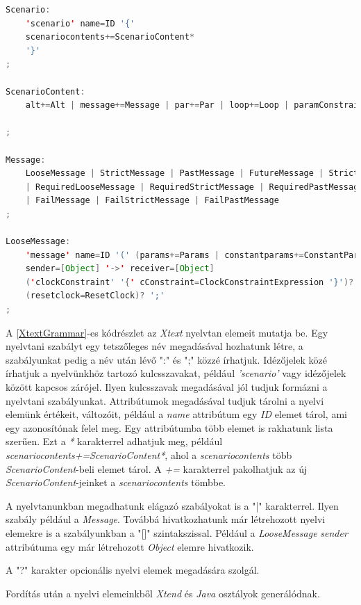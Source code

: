 \begin{lstlisting}[language=java, frame=single, float=ht!, caption={\textit{Xtext} nyelvtan elemei.},captionpos=b, label=XtextGrammar]
Scenario:
	'scenario' name=ID '{'
	scenariocontents+=ScenarioContent*
	'}'
;

ScenarioContent:
	alt+=Alt | message+=Message | par+=Par | loop+=Loop | paramConstraint+=ParameterConstraint

;

Message:
	LooseMessage | StrictMessage | PastMessage | FutureMessage | StrictFutureMessage
	| RequiredLooseMessage | RequiredStrictMessage | RequiredPastMessage | RequiredFutureMessage | RequiredStrictFutureMessage
	| FailMessage | FailStrictMessage | FailPastMessage
;

LooseMessage:
	'message' name=ID '(' (params+=Params | constantparams+=ConstantParams) ')'
	sender=[Object] '->' receiver=[Object]
	('clockConstraint' '{' cConstraint=ClockConstraintExpression '}')? 
	(resetclock=ResetClock)? ';'
;
\end{lstlisting}

A \ref{XtextGrammar}-es kódrészlet az \textit{Xtext} nyelvtan elemeit mutatja be.
Egy nyelvtani szabályt egy tetszőleges név megadásával hozhatunk létre, a szabályunkat pedig a név után lévő ":" és ";" közzé írhatjuk.
Idézőjelek közé írhatjuk a nyelvünkhöz tartozó kulcsszavakat, például \textit{'scenario'} vagy idézőjelek között kapcsos zárójel.
Ilyen kulcsszavak megadásával jól tudjuk formázni a nyelvtani szabályunkat.
Attribútumok megadásával tudjuk tárolni a nyelvi elemünk értékeit, változóit, például a \textit{name} attribútum egy \textit{ID} elemet tárol, ami egy azonosítónak felel meg.
Egy attribútumba több elemet is rakhatunk lista szerűen.
Ezt a \textit{*} karakterrel adhatjuk meg, például \textit{scenariocontents+=ScenarioContent*}, ahol a \textit{scenariocontents} több \textit{ScenarioContent}-beli elemet tárol.
A \textit{+=} karakterrel pakolhatjuk az új \textit{ScenarioContent}-jeinket a \textit{scenariocontents} tömbbe.

A nyelvtanunkban megadhatunk elágazó szabályokat is a "|" karakterrel.
Ilyen szabály például a \textit{Message}.
Továbbá hivatkozhatunk már létrehozott nyelvi elemekre is a szabályunkban a "[]" szintakszissal.
Például a \textit{LooseMessage} \textit{sender} attribútuma egy már létrehozott \textit{Object} elemre hivatkozik.

A "?" karakter opcionális nyelvi elemek megadására szolgál.

Fordítás után a nyelvi elemeinkből \textit{Xtend} és \textit{Java} osztályok generálódnak.

